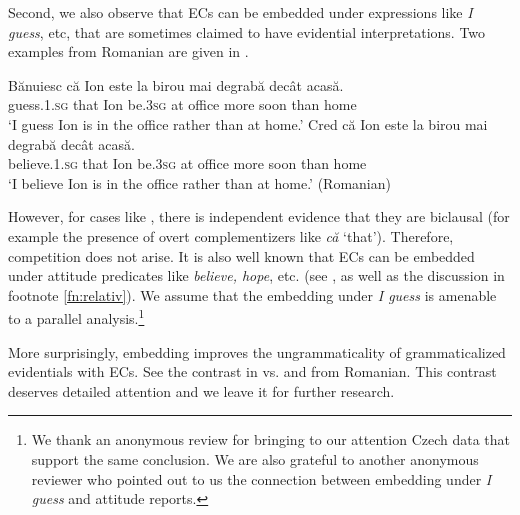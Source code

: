 \documentclass[output=paper,
]{langscibook}
\begin{document}
Second, we also observe that ECs can be embedded under expressions like \textit{I guess}, etc, that are sometimes claimed to have evidential interpretations. Two examples from Romanian are given in . 


	\ea \label{taglexevid} \ea \gll Bănuiesc că Ion este la birou mai degrabă decât acasă.\\
		guess.\textsc{1.sg} that Ion be.\textsc{3sg} at office more soon than home\\ 
		\glt `I guess Ion is in the office rather than at home.'
		\ex \gll Cred că Ion este la birou mai degrabă decât acasă.\\
		believe.\textsc{1.sg} that Ion be.\textsc{3sg} at office more soon than home\\ 
		\glt `I believe Ion is in the office rather than at home.' \hfill (Romanian)
		\z \z 

However, for cases like , there is independent evidence that they are biclausal (for example the presence of overt complementizers like \textit{că} `that'). Therefore, competition does not arise. It is also well known that ECs can be embedded under attitude predicates like \textit{believe, hope}, etc. (see \citealt{herrub14}, as well as the discussion in footnote \ref{fn:relativ}). We assume that the embedding under \textit{I guess} is amenable to a parallel analysis.\footnote{We thank an anonymous review for bringing to our attention Czech data that support the same conclusion. We are also grateful to another anonymous reviewer who pointed out to us the connection between embedding under \textit{I guess} and attitude reports.
}

More surprisingly, embedding improves the ungrammaticality of grammaticalized evidentials with ECs. See the contrast in  vs.  and  from Romanian. This contrast deserves detailed attention and we leave it for further research.

	\ea \label{moremb}  \label{moremba}
		 \label{morembb}
        \z \z 
\end{document}
